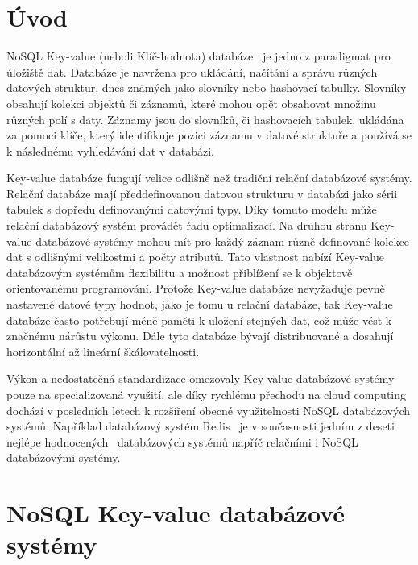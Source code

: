 \documentclass[czech,master,dept460,male,csharp,cpdeclaration]{diploma}
\begin{document}
	
	\MakeTitlePages
	
	\listoffigures
	\listoftables
	
	\chapter{Úvod}
	
	NoSQL Key-value (neboli Klíč-hodnota) databáze~\cite{wiki-key-value-db, ytb-nosql-db} je jedno z paradigmat pro úložiště dat. Databáze je navržena pro ukládání, načítání a správu různých datových struktur, dnes známých jako slovníky nebo hashovací tabulky. Slovníky obsahují kolekci objektů či záznamů, které mohou opět obsahovat množinu různých polí s daty. Záznamy jsou do slovníků, či hashovacích tabulek, ukládána za pomoci klíče, který identifikuje pozici záznamu v datové struktuře a používá se k následnému vyhledávání dat v databázi.
	
	Key-value databáze fungují velice odlišně než tradiční relační databázové systémy. Relační databáze mají předdefinovanou datovou strukturu v databázi jako sérii tabulek s dopředu definovanými datovými typy. Díky tomuto modelu může relační databázový systém provádět řadu optimalizací. Na druhou stranu Key-value databázové systémy mohou mít pro každý záznam různě definované kolekce dat s odlišnými velikostmi a počty atributů. Tato vlastnost nabízí Key-value databázovým systémům flexibilitu a možnost přiblížení se k objektově orientovanému programování. Protože Key-value databáze nevyžaduje pevně nastavené datové typy hodnot, jako je tomu u relační databáze, tak Key-value databáze často potřebují méně paměti k uložení stejných dat, což může vést k značnému nárůstu výkonu. Dále tyto databáze bývají distribuované a dosahují horizontální až lineární škálovatelnosti.
	
	Výkon a nedostatečná standardizace omezovaly Key-value databázové systémy pouze na specializovaná využití, ale díky rychlému přechodu na cloud computing dochází v posledních letech k rozšíření obecné využitelnosti NoSQL databázových systémů. Například databázový systém Redis~\cite{redis} je v současnosti jedním z deseti nejlépe hodnocených~\cite{db-engineers-ranking} databázových systémů napříč relačními i NoSQL databázovými systémy.
	
	\chapter{NoSQL Key-value databázové systémy\label{chapter:no-sql-ky-sys}}
	
\end{document}
